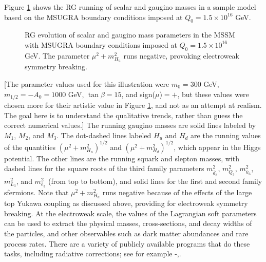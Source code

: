 \documentclass[12pt]{article}
\def\sbar{\overline}
\begin{document}
Figure \ref{fig:running} shows the RG running of scalar and gaugino 
masses in a sample model based on the MSUGRA boundary 
conditions imposed at $Q_0 = 1.5\times 10^{16}$ GeV.
\begin{figure} 
\vspace{-0.2cm}
\centerline{} 
\vspace{-0.24cm}
\caption{RG evolution of scalar and gaugino mass parameters 
in the MSSM with MSUGRA boundary conditions imposed at $Q_0 = 1.5\times 
10^{16}$ GeV. The parameter 
$\mu^2 + m^2_{H_u}$ runs negative, provoking electroweak
symmetry breaking. 
\label{fig:running}}
\end{figure} 
[The parameter values used for this illustration were $m_0 = 300$ GeV, 
$m_{1/2} = -A_0 = 1000$ GeV, $\tan\beta = 15$, and 
sign($\mu$)$=+$, but these values were chosen more for their
artistic value in Figure \ref{fig:running}, and not as an attempt at realism.
The goal here is to understand the qualitative trends, 
rather than guess the correct numerical values.] 
The running gaugino masses are solid lines labeled by 
$M_1$, $M_2$, and $M_3$. The dot-dashed lines labeled $H_u$ and $H_d$ are 
the running values of the quantities $(\mu^2 + m_{H_u}^2)^{1/2}$ and 
$({\mu^2 + m_{H_d}^2})^{1/2}$, which appear in the Higgs potential. The 
other lines are the running squark and slepton masses, with dashed lines 
for the square roots of the third family parameters $m^2_{\sbar d_3}$, 
$m^2_{Q_3}$, $m^2_{\sbar u_3}$, $m^2_{L_3}$, and $m^2_{\sbar e_3}$ (from 
top to bottom), and solid lines for the first and second family sfermions. 
Note that $\mu^2 + m_{H_u}^2$ runs negative because of the effects of the 
large top Yukawa coupling as discussed above, providing for electroweak 
symmetry breaking. At the electroweak scale, the values of the Lagrangian 
soft parameters can be used to extract the physical masses, 
cross-sections, and decay widths of the particles, and other observables 
such as dark matter abundances and rare process rates. There are a variety 
of publicly available programs that do these tasks, including radiative 
corrections; see for example
\cite{ISAJET}-\cite{micrOMEGAs},\cite{FeynHiggs}.
\end{document}
